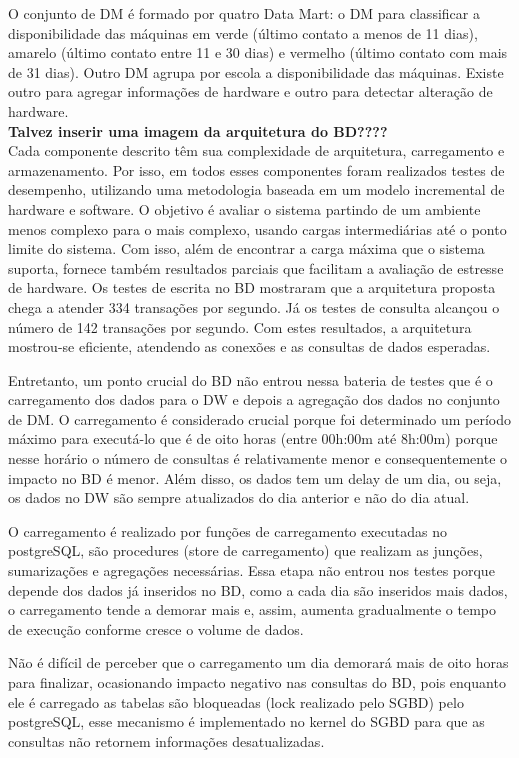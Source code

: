\documentclass[a4paper,12pt]{article}
\begin{document}
O conjunto de DM é formado por quatro Data Mart: o DM para classificar a
disponibilidade das máquinas em verde (último contato a menos de 11 dias),
amarelo (último contato entre 11 e 30 dias) e vermelho (último contato com mais
de 31 dias). Outro DM agrupa por escola a disponibilidade das máquinas. Existe
outro para agregar informações de hardware e outro para detectar alteração de
hardware.\\

\textbf{Talvez inserir uma imagem da arquitetura do BD????}\\

Cada componente descrito têm sua complexidade de arquitetura, carregamento e
armazenamento. Por isso, em todos esses componentes foram realizados testes de
desempenho, utilizando uma metodologia baseada em um modelo incremental de
hardware e software. O objetivo é avaliar o sistema partindo de um ambiente
menos complexo para o mais complexo, usando cargas intermediárias até o ponto
limite do sistema. Com isso, além de encontrar a carga máxima que o sistema
suporta, fornece também resultados parciais que facilitam a avaliação de
estresse de hardware. Os testes de escrita no BD mostraram que a arquitetura
proposta chega a atender 334 transações por segundo. Já os testes de consulta
alcançou o número de 142 transações por segundo. Com estes resultados, a
arquitetura mostrou-se eficiente, atendendo as conexões e as consultas de dados
esperadas.

Entretanto, um ponto crucial do BD não entrou nessa bateria de testes que é o
carregamento dos dados para o DW e depois a agregação dos dados no conjunto de
DM. O carregamento é considerado crucial porque foi determinado um período máximo
para executá-lo que é de oito horas (entre 00h:00m até 8h:00m) porque nesse horário
o número de consultas é relativamente menor e consequentemente o impacto no BD é
menor. Além disso, os dados tem um delay de um dia, ou seja, os dados no DW são
sempre atualizados do dia anterior e não do dia atual. 

O carregamento é realizado por funções de carregamento executadas no postgreSQL,
são procedures (store de carregamento) que realizam as junções, sumarizações e
agregações necessárias. Essa etapa não entrou nos testes porque depende dos dados
já inseridos no BD, como a cada dia são inseridos mais dados, o carregamento
tende a demorar mais e, assim, aumenta gradualmente o tempo de execução conforme
 cresce o volume de dados.

Não é difícil de perceber que o carregamento um dia demorará mais de oito horas
para finalizar, ocasionando impacto negativo nas consultas do BD, pois enquanto
ele é carregado as tabelas são bloqueadas (lock realizado pelo SGBD) pelo
postgreSQL, esse mecanismo é implementado no kernel do SGBD para que as
consultas não retornem informações desatualizadas.
\end{document}
